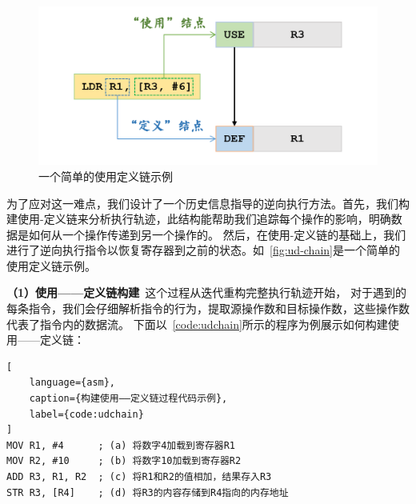 \begin{figure}[h]
    \centering
    \includegraphics[width=1.0\textwidth]{./figure/UD-Chain.png}
    \caption{一个简单的使用定义链示例}
    \label{fig:ud-chain}
\end{figure}

为了应对这一难点，我们设计了一个历史信息指导的逆向执行方法。首先，我们构建使用-定义链来分析执行轨迹，此结构能帮助我们追踪每个操作的影响，明确数据是如何从一个操作传递到另一个操作的。
然后，在使用-定义链的基础上，我们进行了逆向执行指令以恢复寄存器到之前的状态。如~\autoref{fig:ud-chain}是一个简单的使用定义链示例。

\textbf{（1）使用——定义链构建}\ 这个过程从迭代重构完整执行轨迹开始，
对于遇到的每条指令，我们会仔细解析指令的行为，提取源操作数和目标操作数，这些操作数代表了指令内的数据流。
下面以~\autoref{code:udchain}所示的程序为例展示如何构建使用——定义链：
\begin{lstlisting}[
    language={asm},
    caption={构建使用——定义链过程代码示例},
    label={code:udchain}
]
MOV R1, #4      ; (a) 将数字4加载到寄存器R1
MOV R2, #10     ; (b) 将数字10加载到寄存器R2
ADD R3, R1, R2  ; (c) 将R1和R2的值相加，结果存入R3
STR R3, [R4]    ; (d) 将R3的内容存储到R4指向的内存地址
\end{lstlisting}

